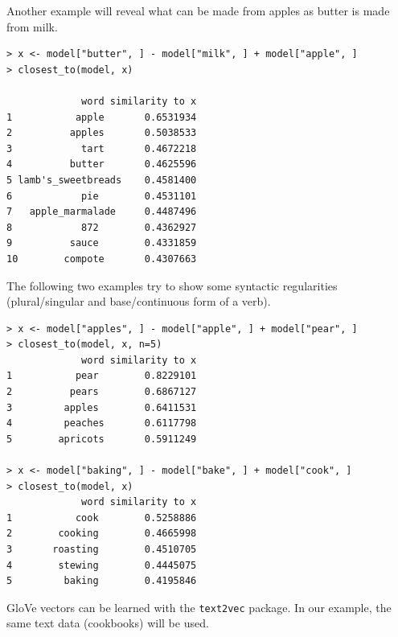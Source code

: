 \documentclass[11pt,openany,executivepaper]{book}
\begin{document}
Another example will reveal what can be made from apples as butter is made from milk.

\begin{verbatim}
> x <- model["butter", ] - model["milk", ] + model["apple", ]
> closest_to(model, x)

             word similarity to x
1           apple       0.6531934
2          apples       0.5038533
3            tart       0.4672218
4          butter       0.4625596
5 lamb's_sweetbreads    0.4581400
6            pie        0.4531101
7   apple_marmalade     0.4487496
8            872        0.4362927
9          sauce        0.4331859
10        compote       0.4307663
\end{verbatim}

The following two examples try to show some syntactic regularities (plural/singular and base/continuous form of a verb).

\begin{verbatim}
> x <- model["apples", ] - model["apple", ] + model["pear", ]
> closest_to(model, x, n=5)
             word similarity to x
1           pear        0.8229101
2          pears        0.6867127
3         apples        0.6411531
4         peaches       0.6117798
5        apricots       0.5911249

> x <- model["baking", ] - model["bake", ] + model["cook", ]
> closest_to(model, x)
             word similarity to x
1           cook        0.5258886
2        cooking        0.4665998
3       roasting        0.4510705
4        stewing        0.4445075
5         baking        0.4195846
\end{verbatim}

GloVe vectors can be learned with the \texttt{text2vec} package. In our example, the same text data (cookbooks) will be used.
\end{document}
